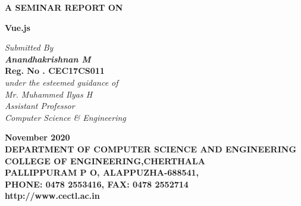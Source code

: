 \documentclass[12pt,a4paper,oneside]{report}
\begin{document}
\renewcommand\bibname{References}
\begin{titlepage}
\begin{center}
\Large{\textbf{A SEMINAR REPORT ON}}\\
\vspace{.2 in}
\begin{singlespace}
\LARGE{\textbf{Vue.js}}\\
\end{singlespace}
\vspace{.2 in}
\Large{\textit{Submitted By }}\\
\Large{\textit{\textbf{Anandhakrishnan M}}} \\
\textbf{Reg. No . CEC17CS011}\\
\Large{\textit{\textit{under the esteemed guidance of}}}\\
\Large{\textit{Mr. Muhammed Ilyas H
}}\\
\Large{\textit{Assistant Professor}}\\
\Large{\textit{Computer Science \& Engineering}}
\vspace{.05in}
\begin{figure}[h]
\begin{center}
\end{center}
\end{figure}
\begin{singlespace}
\large{\textbf{November 2020}}\\
\vspace{.2in}
\large{\textbf{DEPARTMENT OF COMPUTER SCIENCE AND ENGINEERING\\COLLEGE OF ENGINEERING,CHERTHALA\\ PALLIPPURAM P O, ALAPPUZHA-688541, \\PHONE: 0478 2553416, FAX: 0478 2552714\\http://www.cectl.ac.in}}
\end{singlespace}
\end{center}
\end{titlepage}
\end{document}
